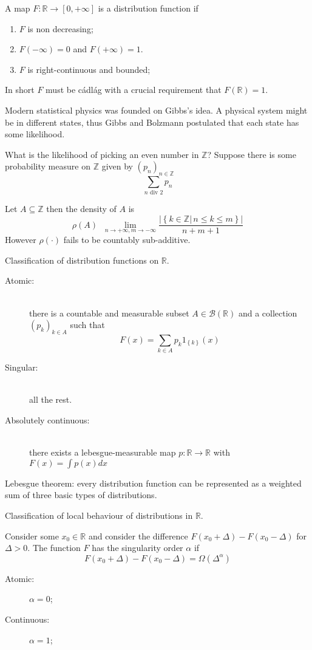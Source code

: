 \documentclass[a4paper]{article}
\newcommand{\obj}[1]{{\left\{ #1 \right \}}}
\newcommand{\clo}[1]{{\left [ #1 \right ]}}
\newcommand{\brac}[1]{{\left ( #1 \right )}}
\newcommand{\induc}[1]{{\left . #1 \right \vert}}
\newcommand{\abs}[1]{{\left | #1 \right |}}
\newcommand{\Real}{\mathbb{R}}
\newcommand{\borel}{\mathcal{B}}
\newcommand{\defn}{\mathop{\overset{\Delta}{=}}\nolimits}
\begin{document}
A map $F:\Real\to \clo{0,+\infty}$ is a distribution function if \begin{enumerate}
	\item $F$ is non decreasing;
	\item $F(-\infty) = 0$ and $F(+\infty) = 1$.
	\item $F$ is right-continuous and bounded;
\end{enumerate}
In short $F$ must be c\'adl\'ag with a crucial requirement that $F(\Real)=1$.

Modern statistical physics was founded on Gibbs's idea.
A physical system might be in different states, thus Gibbs and Bolzmann postulated that each state has some likelihood.

What is the likelihood of picking an even number in $\mathbb{Z}$? Suppose there is some probability measure on $\mathbb{Z}$ given by $\brac{p_n}_{n\in \mathbb{Z}}$ 
\[\sum_{n\text{ div } 2} p_n\]

Let $A\subseteq \mathbb{Z}$ then the density of $A$ is \[\rho(A) \defn \lim_{n\to+\infty, m\to -\infty} \frac{\abs{\obj{\induc{k\in \mathbb{Z}}\,n\leq k\leq m }}}{n+m+1}\]
However $\rho(\cdot)$ fails to be countably sub-additive.

Classification of distribution functions on $\Real$. \begin{description}
	\item[Atomic:] \hfill \\
		there is a countable and measurable subset $A\in \borel(\Real)$ and a collection $\brac{p_k}_{k\in A}$ such that
			\[F(x) = \sum_{k\in A} p_k 1_{\obj{k}}(x)\]
	\item[Singular:] \hfill \\
		all the rest. 
	\item[Absolutely continuous:] \hfill \\
		there exists a lebesgue-measurable map $p:\Real\to\Real$ with $F(x)=\int p(x) dx$
\end{description}

Lebesgue theorem: every distribution function can be represented as a weighted sum of three basic types of distributions.


Classification of local behaviour of distributions in $\Real$.

Consider some $x_0\in \Real$ and consider the difference $F(x_0+\Delta)-F(x_0-\Delta)$ for $\Delta > 0$.
The function $F$ has the singularity order $\alpha$ if \[F(x_0+\Delta)-F(x_0-\Delta) = \Omega(\Delta^\alpha)\]

\begin{description}
	\item[Atomic:] $\alpha = 0$;
	\item[Continuous:] $\alpha = 1$;
\end{description}
\end{document}
